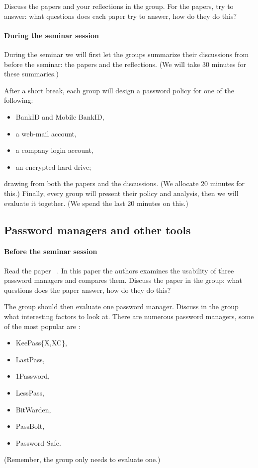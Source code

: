 Discuss the papers and your reflections in the group.
For the papers, try to answer: what questions does each paper try to answer, 
how do they do this?

\paragraph{During the seminar session}

During the seminar we will first let the groups summarize their discussions 
from before the seminar: the papers and the reflections.
(We will take 30 minutes for these summaries.)

After a short break, each group will design a password policy for one of the 
following:
\begin{itemize}
  \item BankID and Mobile BankID,
  \item a web-mail account,
  \item a company login account,
  \item an encrypted hard-drive;
\end{itemize}
drawing from both the papers and the discussions.
(We allocate 20 minutes for this.)
Finally, every group will present their policy and analysis, then we will 
evaluate it together.
(We spend the last 20 minutes on this.)

\subsection{Password managers and other tools}%
\label{password-managers-tools}

\paragraph{Before the seminar session}

Read the paper 
~\cite{UsabilityEvaluationOfPasswordManagers}.
In this paper the authors examines the usability of three password managers and 
compares them.
Discuss the paper in the group: what questions does the paper answer, how do 
they do this?

The group should then evaluate one password manager.
Discuss in the group what interesting factors to look at.
There are numerous password managers, some of the most popular are \eg:
\begin{itemize}
  \item KeePass\{X,XC\},
  \item LastPass,
  \item 1Password,
  \item LessPass,
  \item BitWarden,
  \item PassBolt,
  \item Password Safe.
\end{itemize}
(Remember, the group only needs to evaluate one.)

